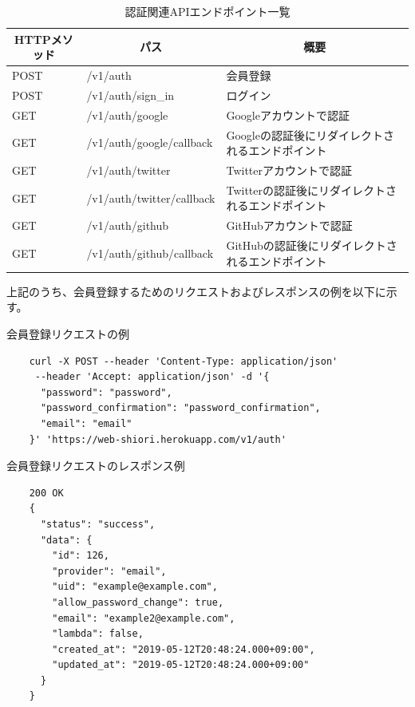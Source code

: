 \begin{table}[htbp]
  \label{tb:design-auth-api}
  \caption{認証関連APIエンドポイント一覧}
  \begin{center}
    \begin{tabular}{|l|l|l|}
      \hline
      \multicolumn{1}{|c|}{\textbf{HTTPメソッド}} & \multicolumn{1}{|c|}{\textbf{パス}} & \multicolumn{1}{|c|}{\textbf{概要}} \\\hline
      POST & /v1/auth & 会員登録 \\\hline
      POST & /v1/auth/sign\_in & ログイン \\\hline
      GET & /v1/auth/google & Googleアカウントで認証 \\\hline
      GET & /v1/auth/google/callback & Googleの認証後にリダイレクトされるエンドポイント \\\hline
      GET & /v1/auth/twitter & Twitterアカウントで認証 \\\hline
      GET & /v1/auth/twitter/callback & Twitterの認証後にリダイレクトされるエンドポイント \\\hline
      GET & /v1/auth/github & GitHubアカウントで認証 \\\hline
      GET & /v1/auth/github/callback & GitHubの認証後にリダイレクトされるエンドポイント \\\hline
    \end{tabular}
  \end{center}
\end{table}

上記のうち、会員登録するためのリクエストおよびレスポンスの例を以下に示す。

\begin{itembox}[l]{会員登録リクエストの例}
  \label{auth-request-curl}
  \begin{verbatim}
    curl -X POST --header 'Content-Type: application/json'
     --header 'Accept: application/json' -d '{
      "password": "password",
      "password_confirmation": "password_confirmation",
      "email": "email"
    }' 'https://web-shiori.herokuapp.com/v1/auth'
  \end{verbatim}
\end{itembox}

\begin{itembox}[l]{会員登録リクエストのレスポンス例}
  \label{auth-response-json}
  \begin{verbatim}
    200 OK
    {
      "status": "success",
      "data": {
        "id": 126,
        "provider": "email",
        "uid": "example@example.com",
        "allow_password_change": true,
        "email": "example2@example.com",
        "lambda": false,
        "created_at": "2019-05-12T20:48:24.000+09:00",
        "updated_at": "2019-05-12T20:48:24.000+09:00"
      }
    }
  \end{verbatim}
\end{itembox}

